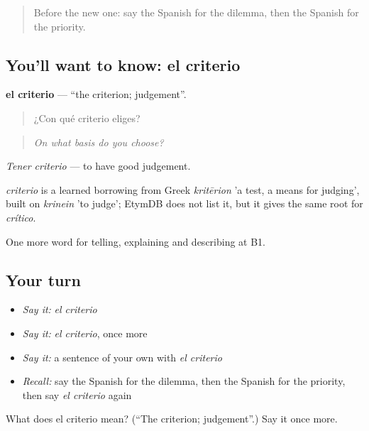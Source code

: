 \label{lesson:ES-C617-criterio}



\begin{quote}
Before the new one: say the Spanish for the dilemma, then the Spanish for the priority.
\end{quote}

\subsection*{You'll want to know: el criterio}
\textbf{el criterio} — \textquotedblleft{}the criterion; judgement\textquotedblright{}.

\begin{quote}
¿Con qué criterio eliges?
\end{quote}

\begin{quote}
\emph{On what basis do you choose?}
\end{quote}

\emph{Tener criterio} — to have good judgement.

\begin{cousinweb}
\emph{criterio} is a learned borrowing from Greek \emph{kritērion} 'a test, a means for judging', built on \emph{krinein} 'to judge'; EtymDB does not list it, but it gives the same root for \emph{crítico}.
\end{cousinweb}

\begin{grammarlens}[title={What you've built}]
One more word for telling, explaining and describing at B1.
\end{grammarlens}

\subsection*{Your turn}
\begin{itemize}
\raggedright
  \item \emph{Say it:} \emph{el criterio}
  \item \emph{Say it:} \emph{el criterio}, once more
  \item \emph{Say it:} a sentence of your own with \emph{el criterio}
  \item \emph{Recall:} say the Spanish for the dilemma, then the Spanish for the priority, then say \emph{el criterio} again
\end{itemize}

\begin{tcolorbox}[breakable,colback=teal!4,colframe=teal!35!black,title={Before you move on}]
What does el criterio mean? (\textquotedblleft{}The criterion; judgement\textquotedblright{}.) Say it once more.
\end{tcolorbox}
